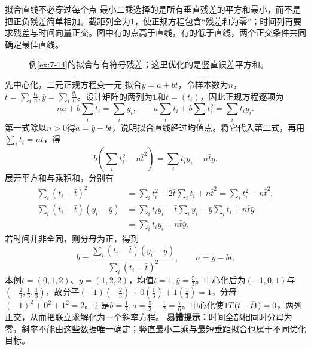 \begin{insight}{拟合直线不必穿过每个点}
最小二乘选择的是所有垂直残差的平方和最小，而不是把正负残差简单相加。截距列全为1，使正规方程包含“残差和为零”；时间列再要求残差与时间向量正交。图中有的点高于直线，有的低于直线，两个正交条件共同确定最佳直线。
\end{insight}
\begin{figure}[H]\centering
{}
\caption{例\ref{ex:7-14}的拟合与有符号残差；这里优化的是竖直误差平方和。}\label{fig:least-squares-fit}
\end{figure}
\begin{clevertrick}{先中心化，二元正规方程变一元}
拟合$y=a+bt$，令样本数为$n$，$\bar t=\sum_i \frac{t_i}{n},\bar y=\sum_i \frac{y_i}{n}$。设计矩阵的两列为$\bm1$和$t=(t_i)$，因此正规方程逐项为
\[na+b\sum_i t_i=\sum_i y_i,\qquad a\sum_i t_i+b\sum_i t_i^2=\sum_i t_i y_i.\]
第一式除以$n>0$得$a=\bar y-b\bar t$，说明拟合直线经过均值点。将它代入第二式，再用$\sum_i t_i=n\bar t$，得
\[b\left(\sum_i t_i^2-n\bar t^2\right)=\sum_i t_i y_i-n\bar t\bar y.\]
展开平方和与乘积和，分别有
\[\begin{aligned}
\sum_i(t_i-\bar t)^2&=\sum_i t_i^2-2\bar t\sum_i t_i+n\bar t^2=\sum_i t_i^2-n\bar t^2,\\
\sum_i(t_i-\bar t)(y_i-\bar y)&=\sum_i t_i y_i-\bar t\sum_i y_i-\bar y\sum_i t_i+n\bar t\bar y\\
&=\sum_i t_i y_i-n\bar t\bar y.
\end{aligned}\]
若时间并非全同，则分母为正，得到
\[b=\dfrac{\sum_i(t_i-\bar t)(y_i-\bar y)}{\sum_i(t_i-\bar t)^2},\qquad a=\bar y-b\bar t.\]
本例$t=(0,1,2)$、$y=(1,2,2)$，均值$\bar t=1,\bar y=\frac{5}{3}$。中心化后为$(-1,0,1)$与$(-\frac{2}{3},\frac{1}{3},\frac{1}{3})$，故分子$(-1)(-\frac{2}{3})+0(\frac{1}{3})+1(\frac{1}{3})=1$，分母$(-1)^2+0^2+1^2=2$。于是$b=\frac{1}{2},a=\frac{5}{3}-\frac{1}{2}=\frac{7}{6}$。中心化使$1T(t-\bar t1)=0$，两列正交，从而把联立求解化为一个斜率方程。
\textbf{易错提示：}时间全部相同时分母为零，斜率不能由这些数据唯一确定；竖直最小二乘与最短垂距拟合也属于不同优化目标。
\end{clevertrick}
